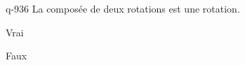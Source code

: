 \begin{truefalse}{q-936}
La composée de deux rotations est une rotation.
\item Vrai
\item* Faux
\end{truefalse}

